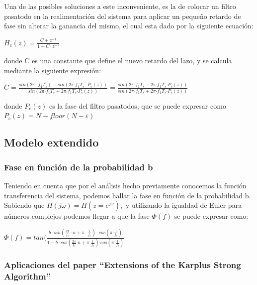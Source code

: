 \documentclass[../ASSD_TP2.tex]{subfiles}
\begin{document}
Una de las posibles soluciones a este inconveniente, es la de colocar
un filtro pasatodo en la realimentación del sistema para aplicar un
pequeño retardo de fase sin alterar la ganancia del mismo, el cual
esta dado por la siguiente ecuación:
\begin{center}
$H_{c}(z)=\frac{C+z^{-1}}{1+C\cdot z^{-1}}$
\par\end{center}

donde C es una constante que define el nuevo retardo del lazo, y se
calcula mediante la siguiente expresión:
\begin{center}
$C=\frac{sin(2\pi\cdot f_{1}T_{s})-sin(2\pi\text{·}f_{1}T_{s}\cdot P_{c}(z))}{sin(2\pi\text{·}f_{1}T_{s}+2\pi\text{·}f_{1}T_{s}\text{·}P_{c}(z))}=\frac{sin(2\pi\text{·}f_{1}T_{s}-2\pi\text{·}f_{1}T_{s}\text{·}P_{c}(z))}{sin(2\pi\text{·}f_{1}T_{s}+2\pi\text{·}f_{1}T_{s}\text{·}P_{c}(z))}$
\par\end{center}

donde $P_{c}(z)$ es la fase del filtro pasatodos, que se puede expresar
como $P_{c}(z)=N-floor(N-\varepsilon)$

\subsection{Modelo extendido }

\subsubsection{Fase en función de la probabilidad b}

Teniendo en cuenta que por el análisis hecho previamente conocemos
la función transferencia del sistema, podemos hallar la fase en función
de la probabilidad b. Sabiendo que $H(j\omega)=H(z=e^{j\omega}),$
y utilizando la igualdad de Euler para números complejos podemos llegar
a que la fase $\Phi(f)$ se puede expresar como:
\begin{center}
$\Phi(f)=tan(\frac{b\cdot sin(\frac{2\pi}{f_{s}}\cdot n+\pi\cdot\frac{1}{f_{s}})\cdot cos(\pi\text{·}\frac{1}{f_{s}})}{1-b\cdot cos(\frac{2\pi}{f_{s}}\text{·}n+\pi\text{·}\frac{1}{f_{s}})\text{·}cos(\pi\text{·}\frac{1}{f_{s}})}$
\par\end{center}

\subsubsection{Aplicaciones del paper ``Extensions of the Karplus Strong Algorithm''}
\end{document}
